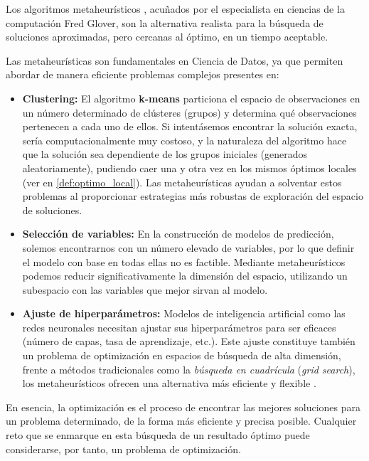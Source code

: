 \documentclass[12pt,a4paper]{book}
\begin{document}
Los algoritmos metaheurísticos \cite{metaheuristicos}, acuñados por el especialista en ciencias de la computación Fred Glover,
son la alternativa realista para la búsqueda de soluciones aproximadas, pero cercanas al óptimo, en un tiempo aceptable.

Las metaheurísticas son fundamentales en Ciencia de Datos, ya que permiten abordar de manera eficiente problemas complejos presentes en:

\begin{itemize}
    \item \textbf{Clustering:} El algoritmo \textbf{k-means} \cite{k-means} particiona el espacio de observaciones en un número determinado de clústeres (grupos) y determina qué observaciones pertenecen a cada uno de ellos. 
    Si intentásemos encontrar la solución exacta, sería computacionalmente muy costoso, y la naturaleza del algoritmo hace que la solución sea dependiente de los grupos iniciales (generados aleatoriamente), pudiendo caer una y otra vez en los mismos óptimos locales (ver en \ref{def:optimo_local}).
    Las metaheurísticas ayudan a solventar estos problemas al proporcionar estrategias más robustas de exploración del espacio de soluciones.
    
    \item \textbf{Selección de variables:} En la construcción de modelos de predicción, solemos encontrarnos con un número elevado de variables, por lo que definir el modelo con base en todas ellas no es factible. Mediante metaheurísticos podemos 
    reducir significativamente la dimensión del espacio, utilizando un subespacio con las variables que mejor sirvan al modelo.
    
    \item \textbf{Ajuste de hiperparámetros:} Modelos de inteligencia artificial como las redes neuronales necesitan ajustar sus hiperparámetros para ser eficaces (número de capas, tasa de aprendizaje, etc.). Este ajuste constituye también un problema de optimización en espacios de búsqueda de alta dimensión, frente a métodos tradicionales como la \textit{búsqueda en cuadrícula} (\textit{grid search}), los metaheurísticos ofrecen una alternativa más eficiente y flexible \cite{hyperparameters}.
\end{itemize}

En esencia, la optimización es el proceso de encontrar las mejores soluciones para un problema determinado, de la forma más eficiente y precisa posible.
Cualquier reto que se enmarque en esta búsqueda de un resultado óptimo puede considerarse, por tanto, un problema de optimización.
\end{document}
